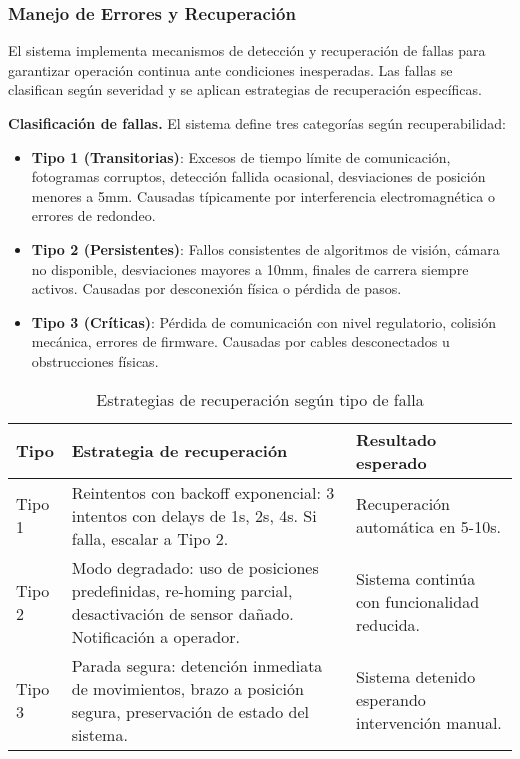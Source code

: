 \subsubsection{Manejo de Errores y Recuperación}

El sistema implementa mecanismos de detección y recuperación de fallas para garantizar operación continua ante condiciones inesperadas. Las fallas se clasifican según severidad y se aplican estrategias de recuperación específicas.

\textbf{Clasificación de fallas.} El sistema define tres categorías según recuperabilidad:

\begin{itemize}[label=$\bullet$]
    \item \textbf{Tipo 1 (Transitorias)}: Excesos de tiempo límite de comunicación, fotogramas corruptos, detección fallida ocasional, desviaciones de posición menores a 5mm. Causadas típicamente por interferencia electromagnética o errores de redondeo.

    \item \textbf{Tipo 2 (Persistentes)}: Fallos consistentes de algoritmos de visión, cámara no disponible, desviaciones mayores a 10mm, finales de carrera siempre activos. Causadas por desconexión física o pérdida de pasos.

    \item \textbf{Tipo 3 (Críticas)}: Pérdida de comunicación con nivel regulatorio, colisión mecánica, errores de firmware. Causadas por cables desconectados u obstrucciones físicas.
\end{itemize}

\begin{table}[H]
\centering
\small
\begin{tabular}{|l|p{5.5cm}|p{5.5cm}|}
\hline
\textbf{Tipo} & \textbf{Estrategia de recuperación} & \textbf{Resultado esperado} \\
\hline
Tipo 1 & Reintentos con backoff exponencial: 3 intentos con delays de 1s, 2s, 4s. Si falla, escalar a Tipo 2. & Recuperación automática en 5-10s. \\
\hline
Tipo 2 & Modo degradado: uso de posiciones predefinidas, re-homing parcial, desactivación de sensor dañado. Notificación a operador. & Sistema continúa con funcionalidad reducida. \\
\hline
Tipo 3 & Parada segura: detención inmediata de movimientos, brazo a posición segura, preservación de estado del sistema. & Sistema detenido esperando intervención manual. \\
\hline
\end{tabular}
\caption{Estrategias de recuperación según tipo de falla}
\label{tab:estrategias_recuperacion}
\end{table}


